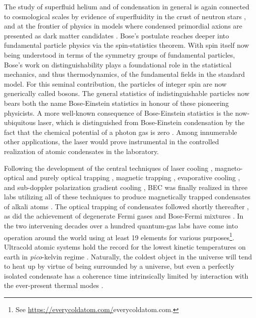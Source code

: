 	The study of superfluid helium and of condensation in general is again connected to cosmological scales by evidence of superfluidity in the crust of neutron stars \cite{Baym69,Martin16,Page11}, and at the frontier of physics in models where condensed primordial axions are presented as dark matter candidates \cite{Mielke09}.
	Bose's postulate reaches deeper into fundamental particle physics via the spin-statistics theorem.
	With spin itself now being understood in terms of the symmetry groups of fundamental particles, Bose's work on distinguishability plays a foundational role in the statistical mechanics, and thus thermodynamics, of the fundamental fields in the standard model. 
	For this seminal contribution, the particles of integer spin are now generically called bosons.
	The general statistics of indistinguishable particles now bears both the name Bose-Einstein statistics in honour of these pioneering physicists. 
	A more well-known consequence of Bose-Einstein statistics is the now-ubiquitous laser, which is distinguished from Bose-Einstein condensation by the fact that the chemical potential of a photon gas is zero \cite{Klaers10,Schmidt16}.
	Among innumerable other applications, the laser would prove instrumental in the controlled realization of atomic condensates in the laboratory.


	Following the development of the central techniques of laser cooling \cite{Phillips82,Chu85}, magneto-optical \cite{Raab87} and purely optical trapping \cite{Chu86}, magnetic trapping \cite{Migdall85},	evaporative cooling \cite{Petrich95},	and sub-doppler polarization gradient cooling \cite{Lett88}, BEC was finally realized in three labs  utilizing all of these techniques to produce magnetically trapped condensates of alkali atoms \cite{Anderson95,Davis95,Bradley95,Cornell02}.	
	The optical trapping of condensates followed shortly thereafter \cite{StamperKurn98}, as did the achievement of degenerate Fermi gases \cite{DeMarco99,Truscott01}	and Bose-Fermi mixtures \cite{Schreck01}.
	In the two intervening decades over a hundred quantum-gas labs have come into operation around the world using at least 19 elements for various purposes\footnote{See \url{https://everycoldatom.com/}{everycoldatom.com}.}.
	Ultracold atomic systems hold the record for the lowest kinetic temperatures on earth in \emph{pico}-kelvin regime \cite{Kastberg95, Manning14}.
	Naturally, the coldest object in the universe will tend to heat up by virtue of being surrounded by a universe, but even a perfectly isolated condensate has a coherence time intrinsically limited by interaction with the ever-present thermal modes \cite{Sinatra09}.
	
